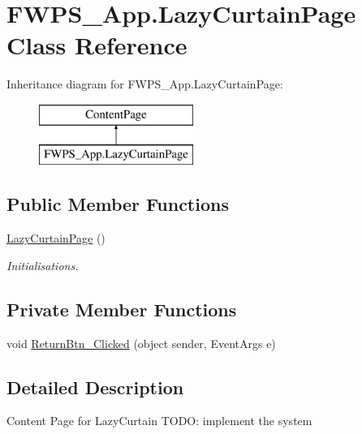 \hypertarget{class_f_w_p_s___app_1_1_lazy_curtain_page}{}\section{F\+W\+P\+S\+\_\+\+App.\+Lazy\+Curtain\+Page Class Reference}
\label{class_f_w_p_s___app_1_1_lazy_curtain_page}
Inheritance diagram for F\+W\+P\+S\+\_\+\+App.\+Lazy\+Curtain\+Page\+:\begin{figure}[H]
\begin{center}
\leavevmode
\includegraphics[height=2.000000cm]{class_f_w_p_s___app_1_1_lazy_curtain_page}
\end{center}
\end{figure}
\subsection*{Public Member Functions}
\begin{DoxyCompactItemize}
\item 
\mbox{\hyperlink{class_f_w_p_s___app_1_1_lazy_curtain_page_adc8ec5efe61300e90007a9faf02a0ae5}{Lazy\+Curtain\+Page}} ()
\begin{DoxyCompactList}\small\item\em Initialisations. \end{DoxyCompactList}\end{DoxyCompactItemize}
\subsection*{Private Member Functions}
\begin{DoxyCompactItemize}
\item 
void \mbox{\hyperlink{class_f_w_p_s___app_1_1_lazy_curtain_page_aaf83169b77cb3e5c8c67764248744762}{Return\+Btn\+\_\+\+Clicked}} (object sender, Event\+Args e)
\end{DoxyCompactItemize}


\subsection{Detailed Description}
Content Page for Lazy\+Curtain T\+O\+DO\+: implement the system 

